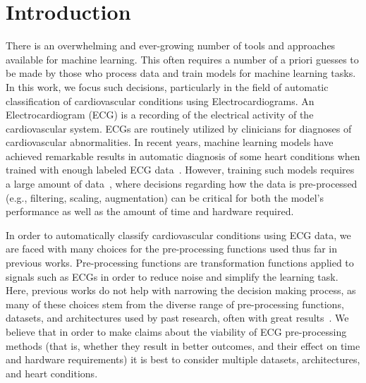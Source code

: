 \documentclass[pmlr,twocolumn]{jmlr}%
\begin{document}
\section{Introduction}
\label{sec:intro}
There is an overwhelming and ever-growing number of tools and approaches available for machine learning. This often requires a number of a priori guesses to be made by those who process data and train models for machine learning tasks. In this work, we focus such decisions, particularly in the field of automatic classification of cardiovascular conditions using Electrocardiograms. 
An Electrocardiogram (ECG) is a recording of the electrical activity of the cardiovascular system. ECGs are routinely utilized by clinicians for diagnoses of cardiovascular abnormalities. In recent years, machine learning models have achieved remarkable results in automatic diagnosis of some heart conditions when trained with enough labeled ECG data~\cite{reyna2021will,reyna4issues}. However, training such models requires a large amount of data~\cite{reyna2021will,reyna4issues,natarajan2020wide,ribeiro2020automatic}, where decisions regarding how the data is pre-processed (e.g., filtering, scaling, augmentation) can be critical for both the model's performance as well as the amount of time and hardware required. 


In order to automatically classify cardiovascular conditions using ECG data, we are faced with many choices for the pre-processing functions used thus far in previous works. Pre-processing functions are transformation functions applied to signals such as ECGs in order to reduce noise and simplify the learning task. Here, previous works do not help with narrowing the decision making process, as many of these choices stem from the diverse range of pre-processing functions, datasets, and architectures used by past research, often with great results~\cite{hong2022practical}. We believe that in order to make claims about the viability of ECG pre-processing methods (that is, whether they result in better outcomes, and their effect on time and hardware requirements) it is best to consider multiple datasets, architectures, and heart conditions.  
\end{document}
